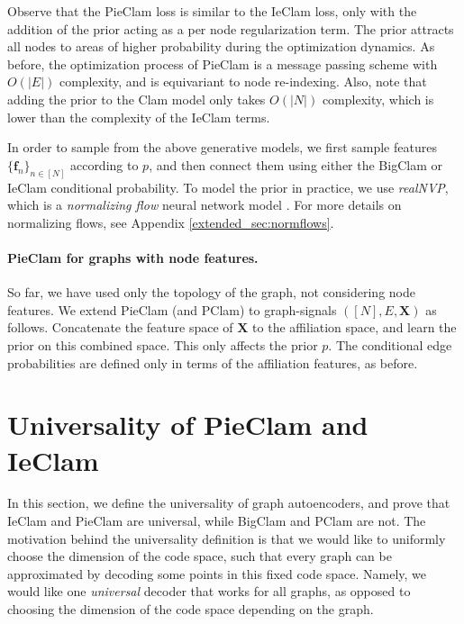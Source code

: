 \documentclass{article}
\theoremstyle{plain}
\theoremstyle{definition}
\theoremstyle{remark}
\begin{document}
Observe that the PieClam loss is similar to the IeClam loss, only with the addition of the prior acting as a per node regularization term. The prior attracts all nodes to areas of higher probability during the optimization dynamics. As before, the optimization process  of PieClam is a message passing scheme with $O(|E|)$ complexity, and is  equivariant to node re-indexing. Also, note that adding the prior to the Clam model only takes $O(|N|)$ complexity, which is lower than the complexity of the IeClam terms.

In order to sample from the above generative models, we first sample features $\{\mathbf{f}_n\}_{n\in [N]}$ according to $p$, and then connect them using either the BigClam or IeClam conditional probability.
%
To model the prior in practice, we use \emph{realNVP},  which is a \emph{normalizing flow} neural network model \cite{dinh2016density}. For more details on normalizing flows, see Appendix \ref{extended_sec:normflows}.



\paragraph{PieClam for graphs with node features.}
\label{sec:pieclam for graphs with node features}

So far, we have used only the topology of the graph, not considering node features. 
We extend PieClam (and PClam) to graph-signals $([N], E, \mathbf{X})$ as follows. Concatenate the feature space of $\mathbf{X}$ to the affiliation space, and learn the prior on this combined space. This only affects the prior $p$. The conditional edge probabilities are  defined only in terms of the affiliation features, as before.

\section{Universality of PieClam and IeClam}

In this section, we define the universality of graph autoencoders, and prove that IeClam and PieClam are universal, while BigClam and PClam are not. The motivation behind the universality definition is that we would like to uniformly choose the dimension of the code space, such that every graph can be approximated by decoding some points in this fixed code space. Namely, we would like one \emph{universal} decoder that works for all graphs, as opposed to choosing the dimension of the code space depending on the graph.
\end{document}
